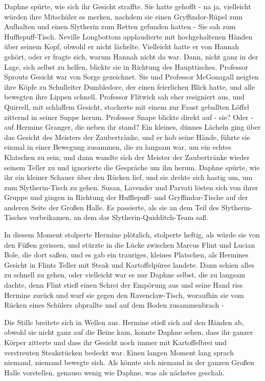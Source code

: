Daphne spürte, wie sich ihr Gesicht straffte. Sie hatte gehofft - na ja,
vielleicht würden ihre Mitschüler es merken, nachdem sie einen Gryffindor-Rüpel
zum Aufhalten und einen Slytherin zum Retten gefunden hatten - Sie sah zum
Hufflepuff-Tisch. Neville Longbottom applaudierte mit hochgehaltenen Händen über
seinem Kopf, obwohl er nicht lächelte. Vielleicht hatte er von Hannah gehört,
oder er fragte sich, warum Hannah nicht da war. Dann, nicht ganz in der Lage,
sich selbst zu helfen, blickte sie in Richtung des Haupttisches. Professor
Sprouts Gesicht war von Sorge gezeichnet. Sie und Professor McGonagall neigten
ihre Köpfe zu Schulleiter Dumbledore, der einen feierlichen Blick hatte, und
alle bewegten ihre Lippen schnell. Professor Flitwick sah eher resigniert aus,
und Quirrell, mit schlaffem Gesicht, stocherte mit einem zur Faust geballten
Löffel zitternd in seiner Suppe herum. Professor Snape blickte direkt auf - sie?
Oder - auf Hermine Granger, die neben ihr stand? Ein kleines, dünnes Lächeln
ging über das Gesicht des Meisters der Zaubertränke, und er hob seine Hände,
führte sie einmal in einer Bewegung zusammen, die zu langsam war, um ein echtes
Klatschen zu sein; und dann wandte sich der Meister der Zaubertränke wieder
seinem Teller zu und ignorierte die Gespräche um ihn herum. Daphne spürte, wie
ihr ein kleiner Schauer über den Rücken lief, und sie drehte sich hastig um, um
zum Slytherin-Tisch zu gehen. Susan, Lavender und Parvati lösten sich von ihrer
Gruppe und gingen in Richtung der Hufflepuff- und Gryffindor-Tische auf der
anderen Seite der Großen Halle. Es passierte, als sie an dem Teil des
Slytherin-Tisches vorbeikamen, an dem das Slytherin-Quidditch-Team saß.

In diesem Moment stolperte Hermine plötzlich, stolperte heftig, als würde sie
von den Füßen gerissen, und stürzte in die Lücke zwischen Marcus Flint und
Lucian Bole, die dort saßen, und es gab ein trauriges, kleines Platschen, als
Hermines Gesicht in Flints Teller mit Steak und Kartoffelpüree landete. Dann
schien alles zu schnell zu gehen, oder vielleicht war es nur Daphne selbst, die
zu langsam dachte, denn Flint stieß einen Schrei der Empörung aus und seine Hand
riss Hermine zurück und warf sie gegen den Ravenclaw-Tisch, woraufhin sie vom
Rücken eines Schülers abprallte und auf dem Boden zusammenbrach -

Die Stille breitete sich in Wellen aus. Hermine stieß sich auf den Händen ab,
obwohl sie nicht ganz auf die Beine kam, konnte Daphne sehen, dass ihr ganzer
Körper zitterte und dass ihr Gesicht noch immer mit Kartoffelbrei und
verstreuten Steakstücken bedeckt war. Einen langen Moment lang sprach niemand,
niemand bewegte sich. Als könnte sich niemand in der ganzen Großen Halle
vorstellen, genauso wenig wie Daphne, was als nächstes geschah.

